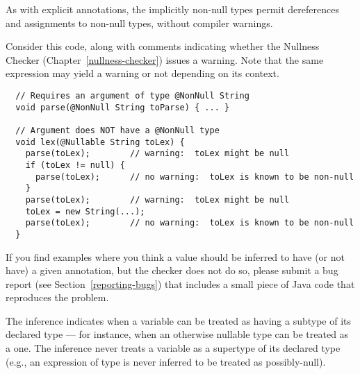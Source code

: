 As with explicit annotations, the implicitly non-null types permit
dereferences and assignments to non-null types, without
compiler warnings.

Consider this code, along with comments indicating whether the
Nullness Checker (Chapter~\ref{nullness-checker}) issues a warning.  Note that the same expression may yield a
warning or not depending on its context.

\begin{Verbatim}
  // Requires an argument of type @NonNull String
  void parse(@NonNull String toParse) { ... }

  // Argument does NOT have a @NonNull type
  void lex(@Nullable String toLex) {
    parse(toLex);        // warning:  toLex might be null
    if (toLex != null) {
      parse(toLex);      // no warning:  toLex is known to be non-null
    }
    parse(toLex);        // warning:  toLex might be null
    toLex = new String(...);
    parse(toLex);        // no warning:  toLex is known to be non-null
  }
\end{Verbatim}

If you find examples where you think a value should be inferred to have
(or not have) a
given annotation, but the checker does not do so, please submit a bug
report (see Section~\ref{reporting-bugs}) that includes a small piece of
Java code that reproduces the problem.

%
%


The inference indicates when a variable can be treated as having a subtype
of its declared type --- for instance, when an otherwise nullable type can be
treated as a  one.  The inference never treats a variable as
a supertype of its declared type (e.g., an expression of 
type is never inferred to be treated as possibly-null).

